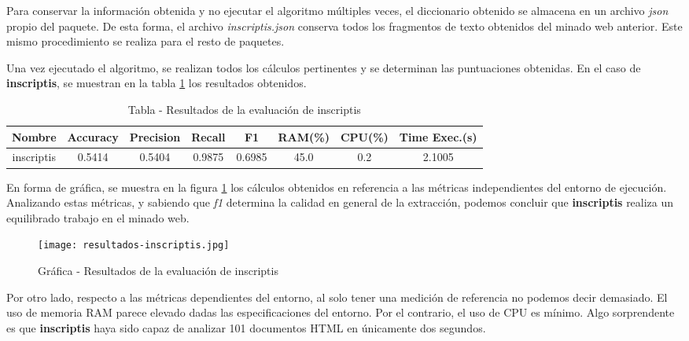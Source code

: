 Para conservar la información obtenida y no ejecutar el algoritmo múltiples veces, el diccionario obtenido
se almacena en un archivo \emph{json} propio del paquete. De esta forma, el archivo \emph{inscriptis.json} 
conserva todos los fragmentos de texto obtenidos del minado web anterior. Este mismo procedimiento se 
realiza para el resto de paquetes.

Una vez ejecutado el algoritmo, se realizan todos los cálculos pertinentes y se determinan las puntuaciones
obtenidas. En el caso de \textbf{inscriptis}, se muestran en la tabla
\ref{tab:tabla - resultados de la evaluacion de inscriptis} los resultados obtenidos.

\begin{table}[h]
    \begin{center}
      \begin{tabular}{| c | c | c | c | c | c | c | c |} \hline 
       \textbf{Nombre} & \textbf{Accuracy} & \textbf{Precision}  & \textbf{Recall} & \textbf{F1} & \textbf{RAM(\%)} & \textbf{CPU(\%)} & \textbf{Time Exec.(s)} \\ \hline
       inscriptis & 0.5414 & 0.5404 & 0.9875 & 0.6985 & 45.0 & 0.2 & 2.1005 \\ \hline
      \end{tabular}
      \caption{Tabla - Resultados de la evaluación de inscriptis}
      \label{tab:tabla - resultados de la evaluacion de inscriptis}
    \end{center}
\end{table} 

En forma de gráfica, se muestra en la figura \ref{img:grafica - resultados de la evaluacion de inscriptis}
los cálculos obtenidos en referencia a las métricas independientes del entorno de ejecución. Analizando
estas métricas, y sabiendo que \emph{f1} determina la calidad en general de la extracción, podemos concluir
que \textbf{inscriptis} realiza un equilibrado trabajo en el minado web.

\begin{figure}[tphb]
    \centering
    \texttt{[image: resultados-inscriptis.jpg]}
    \caption{Gráfica - Resultados de la evaluación de inscriptis}
    \label{img:grafica - resultados de la evaluacion de inscriptis}
\end{figure}

Por otro lado, respecto a las métricas dependientes del entorno, al solo tener una medición de referencia 
no podemos decir demasiado. El uso de memoria RAM parece elevado dadas las especificaciones del entorno. 
Por el contrario, el uso de CPU es mínimo. Algo sorprendente es que \textbf{inscriptis} haya sido capaz de 
analizar 101 documentos HTML en únicamente dos segundos.

